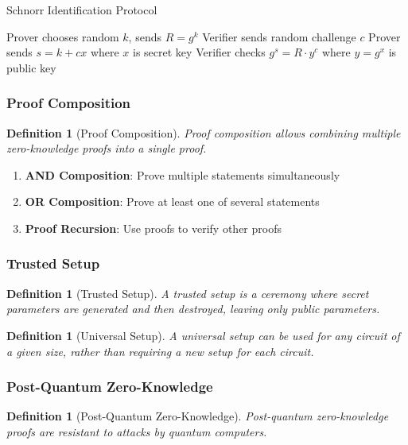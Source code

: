 \documentclass[11pt,a4paper]{article}
\newtheorem{definition}[theorem]{Definition}
\begin{document}
\begin{algorithm}
\caption{Schnorr Identification Protocol}
\begin{algorithmic}[1]
\STATE Prover chooses random $k$, sends $R = g^k$
\STATE Verifier sends random challenge $c$
\STATE Prover sends $s = k + cx$ where $x$ is secret key
\STATE Verifier checks $g^s = R \cdot y^c$ where $y = g^x$ is public key
\end{algorithmic}
\end{algorithm}

\subsubsection{Proof Composition}

\begin{definition}[Proof Composition]
Proof composition allows combining multiple zero-knowledge proofs into a single proof.
\end{definition}

\begin{enumerate}
\item \textbf{AND Composition}: Prove multiple statements simultaneously
\item \textbf{OR Composition}: Prove at least one of several statements
\item \textbf{Proof Recursion}: Use proofs to verify other proofs
\end{enumerate}

\subsubsection{Trusted Setup}

\begin{definition}[Trusted Setup]
A trusted setup is a ceremony where secret parameters are generated and then destroyed, leaving only public parameters.
\end{definition}

\begin{definition}[Universal Setup]
A universal setup can be used for any circuit of a given size, rather than requiring a new setup for each circuit.
\end{definition}

\subsubsection{Post-Quantum Zero-Knowledge}

\begin{definition}[Post-Quantum Zero-Knowledge]
Post-quantum zero-knowledge proofs are resistant to attacks by quantum computers.
\end{definition}
\end{document}
